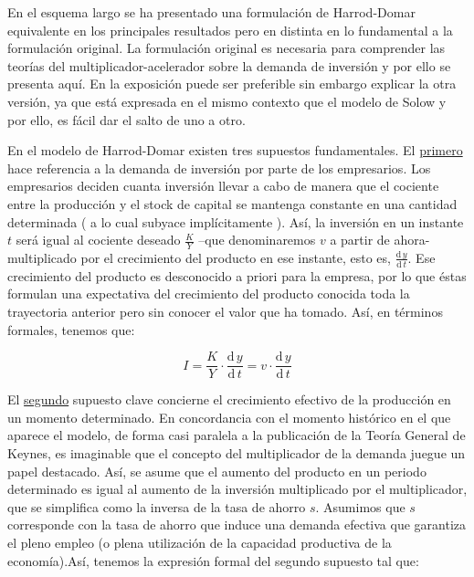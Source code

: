 \documentclass{nuevotema}
\begin{document}

En el esquema largo se ha presentado una formulación de Harrod-Domar equivalente en los principales resultados pero en distinta en lo fundamental a la formulación original. La formulación original es necesaria para comprender las teorías del multiplicador-acelerador sobre la demanda de inversión y por ello se presenta aquí. En la exposición puede ser preferible sin embargo explicar la otra versión, ya que está expresada en el mismo contexto que el modelo de Solow y por ello, es fácil dar el salto de uno a otro.

En el modelo de Harrod-Domar existen tres supuestos fundamentales. El \underline{primero} hace referencia a la demanda de inversión por parte de los empresarios. Los empresarios deciden cuanta inversión llevar a cabo de manera que el cociente entre la producción y el stock de capital se mantenga constante en una cantidad determinada ( a lo cual subyace implícitamente ). Así, la inversión en un instante $t$ será igual al cociente deseado $\frac{K}{Y}$ --que denominaremos $v$ a partir de ahora- multiplicado por el crecimiento del producto en ese instante, esto es, $\frac{\text{d} \, y}{\text{d} \, t}$. Ese crecimiento del producto es desconocido a priori para la empresa, por lo que éstas formulan una expectativa del crecimiento del producto conocida toda la trayectoria anterior pero sin conocer el valor que ha tomado. Así, en términos formales, tenemos que:

\begin{equation}
I = \frac{K}{Y} \cdot \frac{\text{d} \, y}{\text{d} \, t} = v \cdot \frac{\text{d} \, y}{\text{d} \, t}
\end{equation}

El \underline{segundo} supuesto clave concierne el crecimiento efectivo de la producción en un momento determinado. En concordancia con el momento histórico en el que aparece el modelo, de forma casi paralela a la publicación de la Teoría General de Keynes, es imaginable que el concepto del multiplicador de la demanda juegue un papel destacado. Así, se asume que el aumento del producto en un periodo determinado es igual al aumento de la inversión multiplicado por el multiplicador, que se simplifica como la inversa de la tasa de ahorro $s$. Asumimos que $s$ corresponde con la tasa de ahorro que induce una demanda efectiva que garantiza el pleno empleo (o plena utilización de la capacidad productiva de la economía).Así, tenemos la expresión formal del segundo supuesto tal que:
\end{document}

